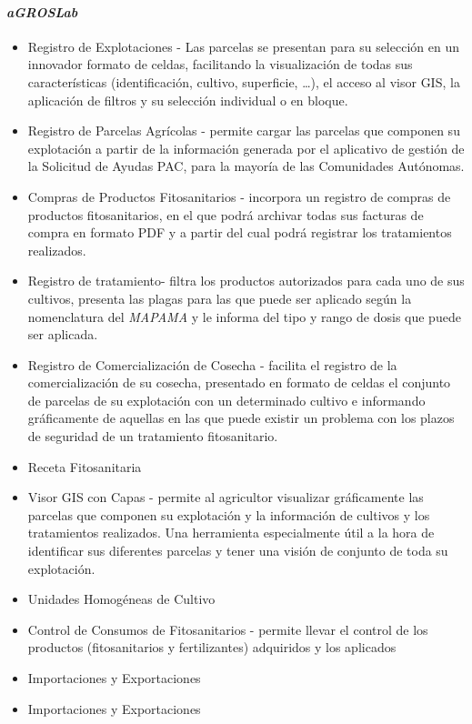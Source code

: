 \paragraph*{\textit{aGROSLab}} \cite{agroslab}
\begin{itemize}
\item Registro de Explotaciones - Las parcelas se presentan para su selección en un innovador formato de celdas, facilitando la visualización de todas sus características (identificación, cultivo, superficie, …), el acceso al visor GIS, la aplicación de filtros y su selección individual o en bloque.
\item Registro de Parcelas Agrícolas - permite cargar las parcelas que componen su explotación a partir de la información generada por el aplicativo de gestión de la Solicitud de Ayudas PAC, para la mayoría de las Comunidades Autónomas.
\item Compras de Productos Fitosanitarios - incorpora un registro de compras de productos fitosanitarios, en el que podrá archivar todas sus facturas de compra en formato PDF y a partir del cual podrá registrar los tratamientos realizados.
\item Registro de \gls{tratamiento}- filtra los productos autorizados para cada uno de sus cultivos, presenta las plagas para las que puede ser aplicado según la nomenclatura del \textit{MAPAMA} y le informa del tipo y rango de dosis que puede ser aplicada.
\item Registro de Comercialización de Cosecha - facilita el registro de la comercialización de su cosecha, presentado en formato de celdas el conjunto de parcelas de su explotación con un determinado cultivo e informando gráficamente de aquellas en las que puede existir un problema con los plazos de seguridad de un tratamiento fitosanitario.
\item Receta Fitosanitaria 
\item Visor GIS con Capas - permite al agricultor visualizar gráficamente las parcelas que componen su explotación y la información de cultivos y los tratamientos realizados. Una herramienta especialmente útil a la hora de identificar sus diferentes parcelas y tener una visión de conjunto de toda su explotación.
\item Unidades Homogéneas de Cultivo
\item Control de Consumos de Fitosanitarios - permite llevar el control de los productos (fitosanitarios y fertilizantes) adquiridos y los aplicados
\item Importaciones y Exportaciones 
\item Importaciones y Exportaciones 
\end{itemize}
